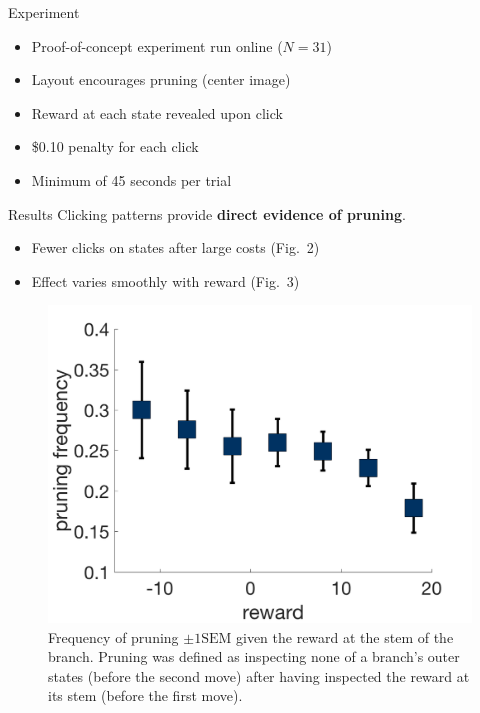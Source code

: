 \documentclass[final]{beamer}
\newlength{\onecolwid}
\begin{document}
\begin{frame}[t, fragile]
\begin{columns}[t]
\begin{column}{\onecolwid}
  \begin{block}{Experiment}\label{experiment}
    \begin{itemize}
      \item Proof-of-concept experiment run online ($N=31$)
      \item Layout encourages pruning (center image)
      \item Reward at each state revealed upon click
      \item \$0.10 penalty for each click
      \item Minimum of 45 seconds per trial
    \end{itemize}
  \end{block}

  \begin{block}{Results}\label{results}
    Clicking patterns provide \textbf{direct evidence of pruning}.
    \begin{itemize}
      \item Fewer clicks on states after large costs (Fig.~2)
      \item Effect varies smoothly with reward (Fig.~3)
    \end{itemize}
  \end{block}

  \begin{figure}
    \label{fig:pruning}
    \includegraphics[width=0.9\linewidth]{figs/prunning_any_noFB.png}
    \captionsetup{width=0.9\linewidth}
    \caption[first]{Frequency of pruning $\pm 1 \text{SEM}$ given the reward at the stem of the branch. Pruning was defined as inspecting none of a branch's outer states (before the second move) after having inspected the reward at its stem (before the first move).}
  \end{figure}


\end{column}
\end{columns}
\end{frame}
\end{document}
